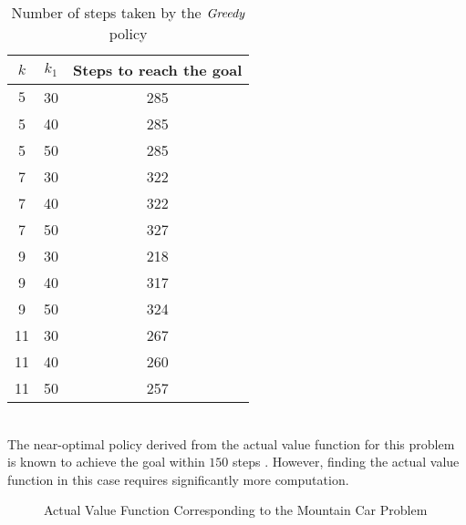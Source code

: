 \begin{table}
\begin{tabular}{|c|c|c|} \hline
$k$ & $k_1$ &Steps to reach the goal\\ \hline	
$5$ &30 &285 \\ \hline
5 &40 &285 \\ \hline
5 &50 &285 \\ \hline

7 &30 &322 \\ \hline
7 &40 &322 \\ \hline
7 &50 &327 \\ \hline

9 &30 &218 \\ \hline
9 &40 &317 \\ \hline
9 &50 &324 \\ \hline

11 &30 &267 \\ \hline
11 &40 &260 \\ \hline
11 &50 &257 \\ \hline
\end{tabular}
\caption{Number of steps taken by the $\emph{Greedy}$ policy}
\label{episode}
\end{table}\\
The near-optimal policy derived from the actual value function for this problem is known to achieve the goal within $150$ steps \cite{rl}. However, finding the actual value function in this case requires significantly more computation.
\begin{figure}
\caption{Actual Value Function Corresponding to the Mountain Car Problem}
\label{actvalfunc}
\end{figure}

